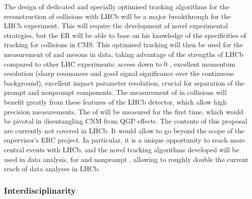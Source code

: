 \documentclass[a4paper,11pt]{article}
\newcommand{\ER}{ER\xspace}
\newcommand{\supervisor}{the supervisor\xspace}
\begin{document}
The design of dedicated and specially optimised tracking algorithms for the reconstruction of \pbpb collisions with LHCb will be a major breakthrough for the LHCb experiment. This will require the development of novel experimental strategies, but the \ER will be able to base on his knowledge of the specificities of tracking for \pbpb collisions in CMS.
%
This optimised tracking will then be used for the measurement of \Dz and \Jpsi mesons in \pbpb data, taking advantage of the strengths of LHCb compared to other LHC experiments: access down to 0 \pt, excellent momentum resolution (sharp resonances and good signal significance over the continuous background), excellent impact parameter resolution, crucial for separation of the prompt and nonprompt components.
%
The measurement of \PgUabc in \ppb collisions will benefit greatly from these features of the LHCb detector, which allow high precision measurements. The \rpa of \PgUc will be measured for the first time, which would be pivotal in disentangling CNM from QGP effects.
%
The contents of this proposal are currently not covered in LHCb. It would allow to go beyond the scope of \supervisor's ERC project. In particular, it is a unique opportunity to reach more central \pbpb events with LHCb, and the novel tracking algorithms developed will be used in data analysis, for \Dz and nonprompt \Jpsi, allowing to roughly double the current \npart reach of data analyses in LHCb. 
% 
% 

% 

\subsubsection{Interdisciplinarity}
\end{document}
